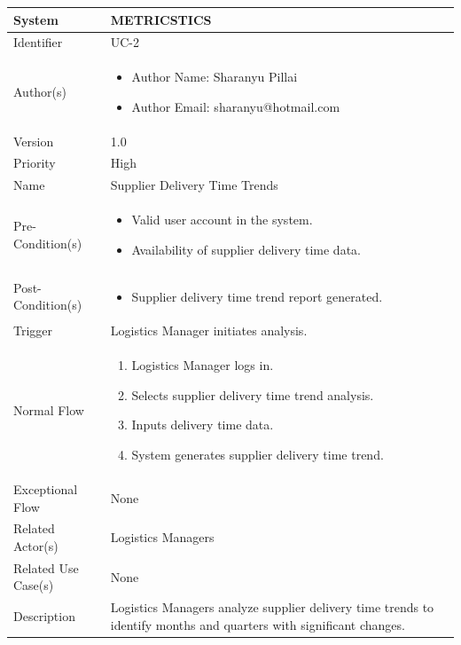 \begin{center}
	\begin{tabularx}{\textwidth}{|l|X|}
		\hline
		System & METRICSTICS \\
		\hline
		Identifier & UC-2 \\
		\hline
		Author(s) & \begin{itemize}[left=0pt]
			\item Author Name: Sharanyu Pillai
			\item Author Email: sharanyu@hotmail.com
		\end{itemize} \\
		\hline
		Version & 1.0 \\
		\hline
		Priority & High \\
		\hline
		Name & Supplier Delivery Time Trends \\
		\hline
		Pre-Condition(s) &  \begin{itemize}[left=0pt]
			\item Valid user account in the system.
			\item Availability of supplier delivery time data.
		\end{itemize} \\
		\hline
		Post-Condition(s) & \begin{itemize}[left=0pt]
			\item Supplier delivery time trend report generated.
		\end{itemize} \\
		\hline
		Trigger & Logistics Manager initiates analysis. \\
		\hline
		Normal Flow & \begin{enumerate}[left=0pt]
			\item Logistics Manager logs in.
			\item Selects supplier delivery time trend analysis.
			\item Inputs delivery time data.
			\item System generates supplier delivery time trend.
		\end{enumerate} \\
		\hline
		Exceptional Flow & None \\
		\hline
		Related Actor(s) & Logistics Managers \\
		\hline
		Related Use Case(s) & None \\
		\hline
		Description & Logistics Managers analyze supplier delivery time trends to identify months and quarters with significant changes. \\
		\hline
	\end{tabularx}
\end{center}

